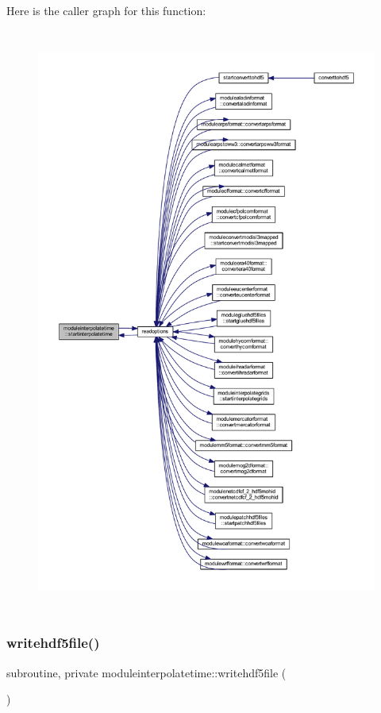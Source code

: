 Here is the caller graph for this function\+:\nopagebreak
\begin{figure}[H]
\begin{center}
\leavevmode
\includegraphics[height=550pt]{namespacemoduleinterpolatetime_a9ee23aab51e3ce1e657af4c8074b2ae2_icgraph}
\end{center}
\end{figure}
\mbox{\label{namespacemoduleinterpolatetime_aa6ef370ca77afaafd53df4bf43525f3d}} 
\subsubsection{\texorpdfstring{writehdf5file()}{writehdf5file()}}
{\footnotesize\ttfamily subroutine, private moduleinterpolatetime\+::writehdf5file (\begin{DoxyParamCaption}{ }\end{DoxyParamCaption})\hspace{0.3cm}{\ttfamily [private]}}


